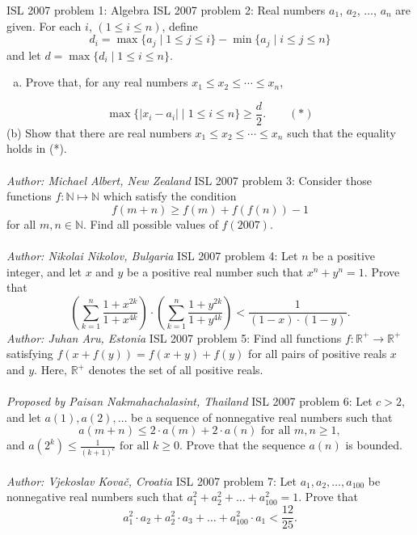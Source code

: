 ISL 2007 problem 1:  Algebra 
ISL 2007 problem 2:  Real numbers $ a_1$, $ a_2$, $ \ldots$, $ a_n$ are given. For each $ i$, $ (1 \leq i \leq n )$, define
\[ d_i = \max \{ a_j\mid 1 \leq j \leq i \} - \min \{ a_j\mid i \leq j \leq n \} \]
and let $ d = \max \{d_i\mid 1 \leq i \leq n \}$.
\begin{enumerate}[(a)]
  \item Prove that, for any real numbers $ x_1\leq x_2\leq \cdots \leq x_n$,
\end{enumerate}
\[ \max \{ |x_i - a_i| \mid 1 \leq i \leq n \}\geq \frac {d}{2}. \quad \quad (*) \]
(b) Show that there are real numbers $ x_1\leq x_2\leq \cdots \leq x_n$ such that the equality holds in (*). \\\\
\textit{Author: Michael Albert, New Zealand} 
ISL 2007 problem 3:  Consider those functions $ f: \mathbb{N} \mapsto \mathbb{N}$ which satisfy the condition
\[ f(m + n) \geq f(m) + f(f(n)) - 1 \]
for all $ m,n \in \mathbb{N}.$ Find all possible values of $ f(2007).$ \\\\
\textit{Author: Nikolai Nikolov, Bulgaria} 
ISL 2007 problem 4:  Let $ n$ be a positive integer, and let $ x$ and $ y$ be a positive real number such that $ x^n + y^n = 1.$ Prove that
\[
\left(\sum^n_{k = 1} \frac {1 + x^{2k}}{1 + x^{4k}} \right) \cdot \left( \sum^n_{k = 1} \frac {1 + y^{2k}}{1 + y^{4k}} \right) < \frac {1}{(1 - x) \cdot (1 - y)}.
\]
\textit{Author: Juhan Aru, Estonia} 
ISL 2007 problem 5:  Find all functions $ f: \mathbb{R}^{ + }\to\mathbb{R}^{ + }$ satisfying $ f\left(x + f\left(y\right)\right) = f\left(x + y\right) + f\left(y\right)$ for all pairs of positive reals $ x$ and $ y$. Here, $ \mathbb{R}^{ + }$ denotes the set of all positive reals. \\\\
\textit{Proposed by Paisan Nakmahachalasint, Thailand} 
ISL 2007 problem 6:  Let $ c > 2,$ and let $ a(1), a(2), \ldots$ be a sequence of nonnegative real numbers such that
\[ a(m + n) \leq 2 \cdot a(m) + 2 \cdot a(n) \text{ for all } m,n \geq 1, \]
and $ a\left(2^k \right) \leq \frac {1}{(k + 1)^c} \text{ for all } k \geq 0.$ Prove that the sequence $ a(n)$ is bounded. \\\\
\textit{Author: Vjekoslav Kovač, Croatia} 
ISL 2007 problem 7:  Let $ a_1, a_2, \ldots, a_{100}$ be nonnegative real numbers such that $ a^2_1 + a^2_2 + \ldots + a^2_{100} = 1.$ Prove that
\[ a^2_1 \cdot a_2 + a^2_2 \cdot a_3 + \ldots + a^2_{100} \cdot a_1 < \frac {12}{25}. \]
